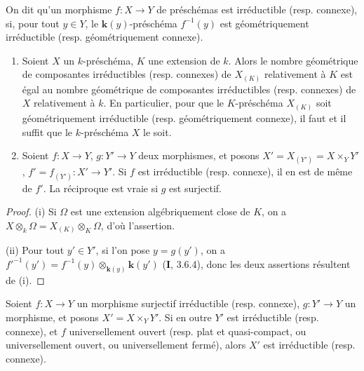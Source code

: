 \begin{definition}[4.5.5]
\label{IV.2.4.5.5-fr}
On dit qu'un morphisme $f:X\to Y$ de préschémas est irréductible
\textup{(resp.} connexe\textup{)}, si, pour tout $y\in Y$, le $\boldsymbol{k}(y)$-préschéma
$f^{-1}(y)$ est géométriquement irréductible \textup{(resp.} géométriquement connexe\textup{)}.
\end{definition}

\begin{proposition}[4.5.6]
\label{IV.2.4.5.6-fr}
\begin{enumerate}
\item[\textup{(i)}] Soient $X$ un $k$-préschéma, $K$ une extension de $k$. Alors le
nombre géométrique de composantes irréductibles \textup{(resp.} connexes\textup{)} de $X_{(K)}$
relativement à $K$ est égal au nombre géométrique de composantes irréductibles
\textup{(resp.} connexes\textup{)} de $X$ relativement à $k$. En particulier, pour que le
$K$-préschéma $X_{(K)}$ soit géométriquement irréductible \textup{(resp.}
géométriquement connexe\textup{)}, il faut et il suffit que le $k$-préschéma $X$ le
soit.
\item[\textup{(ii)}] Soient $f:X\to Y$, $g:Y'\to Y$ deux morphismes, et posons
$X'=X_{(Y')}=X\times_Y Y'$, $f'=f_{(Y')}:X'\to Y'$. Si $f$ est irréductible
\textup{(resp.} connexe\textup{)}, il en est de même de $f'$. La réciproque est vraie si $g$ est
surjectif.
\end{enumerate}
\end{proposition}

\begin{proof}
(i) Si $\Omega$ est une extension algébriquement close de $K$, on a
$X\otimes_k\Omega=X_{(K)}\otimes_K\Omega$, d'où l'assertion.

(ii) Pour tout $y'\in Y'$, si l'on pose $y=g(y')$, on a
$f'^{-1}(y')=f^{-1}(y)\otimes_{\mathbf{k}(y)}\boldsymbol{k}(y')$ (\textbf{I}, 3.6.4), donc les deux assertions
résultent de (i).
\end{proof}

\begin{proposition}[4.5.7]
\label{IV.2.4.5.7-fr}
Soient $f:X\to Y$ un morphisme surjectif irréductible \textup{(resp.} connexe\textup{)},
$g:Y'\to Y$ un morphisme, et posons $X'=X\times_Y Y'$. Si en outre $Y'$ est
irréductible \textup{(resp.} connexe\textup{)}, et $f$ universellement ouvert \textup{(resp.} plat et
quasi-compact, ou universellement ouvert, ou universellement fermé\textup{)}, alors
$X'$ est irréductible \textup{(resp.} connexe\textup{)}.
\end{proposition}

